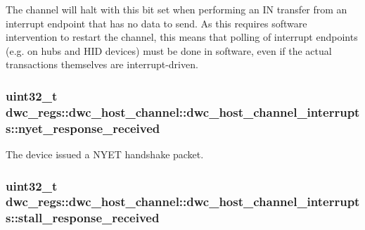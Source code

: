 The channel will halt with this bit set when performing an I\-N transfer from an interrupt endpoint that has no data to send. As this requires software intervention to restart the channel, this means that polling of interrupt endpoints (e.\-g. on hubs and H\-I\-D devices) must be done in software, even if the actual transactions themselves are interrupt-\/driven. \hypertarget{uniondwc__regs_1_1dwc__host__channel_1_1dwc__host__channel__interrupts_a50ee2ce16b7d94abd934970835fdbe30}{
\subsubsection[{nyet\-\_\-response\-\_\-received}]{\setlength{\rightskip}{0pt plus 5cm}uint32\-\_\-t dwc\-\_\-regs\-::dwc\-\_\-host\-\_\-channel\-::dwc\-\_\-host\-\_\-channel\-\_\-interrupts\-::nyet\-\_\-response\-\_\-received}}\label{uniondwc__regs_1_1dwc__host__channel_1_1dwc__host__channel__interrupts_a50ee2ce16b7d94abd934970835fdbe30}
The device issued a N\-Y\-E\-T handshake packet. \hypertarget{uniondwc__regs_1_1dwc__host__channel_1_1dwc__host__channel__interrupts_a6f9935f073878b63944c7c1ab1953f1a}{
\subsubsection[{stall\-\_\-response\-\_\-received}]{\setlength{\rightskip}{0pt plus 5cm}uint32\-\_\-t dwc\-\_\-regs\-::dwc\-\_\-host\-\_\-channel\-::dwc\-\_\-host\-\_\-channel\-\_\-interrupts\-::stall\-\_\-response\-\_\-received}}\label{uniondwc__regs_1_1dwc__host__channel_1_1dwc__host__channel__interrupts_a6f9935f073878b63944c7c1ab1953f1a}
